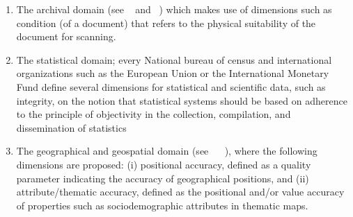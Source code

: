 \begin{enumerate}
    \item {The archival domain (see ~\cite{wiszniewskib.krawczykh.2003} and ~\cite{krawczykh.wiszniewskib.2003})
    which makes use of dimensions such as condition (of a document) that
    refers to the physical suitability of the document for scanning.}
    \item {The statistical domain; every National bureau of census and international
organizations such as the European Union or the International Monetary Fund define several dimensions for statistical and scientific data,
such as integrity, on the notion that statistical systems should be based on adherence to the principle of objectivity in the collection, compilation,
and dissemination of statistics
    }
    \item{ The geographical and geospatial domain (see ~\cite{ostmana.1997} ~\cite{guptilc.morrisonj.1995}), where
the following dimensions are proposed: (i) positional accuracy, defined as a
quality parameter indicating the accuracy of geographical positions, and
(ii) attribute/thematic accuracy, defined as the positional and/or value
accuracy of properties such as sociodemographic attributes in thematic maps.
    }
\end{enumerate}


